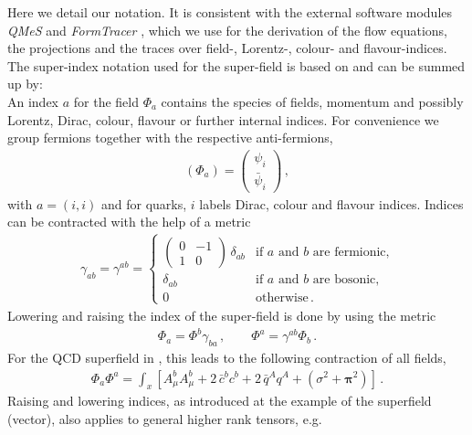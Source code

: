 \documentclass[aps,twocolumn,prd,superscriptaddress]{revtex4-2}
\begin{document}
Here we detail our notation. It is consistent with the external software modules \textit{QMeS} \cite{Pawlowski:2021tkk} and \textit{FormTracer} \cite{Cyrol:2016zqb}, which we use for the derivation of the flow equations, the projections and the traces over field-, Lorentz-, colour- and flavour-indices. The super-index notation used for the super-field  is based on \cite{Pawlowski:2005xe} and can be summed up by:\\[-2ex]

An index $a$ for the field $\Phi_a$ contains the species of fields, momentum and possibly Lorentz, Dirac, colour, flavour or further internal indices. For convenience we group fermions together with the respective anti-fermions, 
%
\begin{align}
	(\Phi_a) = \begin{pmatrix}
		\psi_{i} \\ \bar{\psi}_{i} 
	\end{pmatrix} \,, 
	\label{eq:PsiBarPsi}
\end{align}
%
with $a=(i,i)$ and for quarks, $i$ labels Dirac, colour and flavour indices. Indices can be contracted with the help of a metric
%
\begin{align}
	\gamma_{ab} = \gamma^{ab} = \begin{cases}
		\begin{pmatrix}
			0 & -1 \\
			1 & 0
		\end{pmatrix}\,\delta_{ab}
		& \text{if $a$ and $b$ are fermionic,} \\[3ex]
		\delta_{ab} & \text{if $a$ and $b$ are bosonic,}   \\[2ex]
		0               & \text{otherwise} \,.
	\end{cases}
\end{align}
%
Lowering and raising the index of the super-field is done by using the metric
%
\begin{align}
	\Phi_a = \Phi^b\gamma_{ba} \,,
	\quad \quad
	\Phi^a = \gamma^{ab}\Phi_b \,.
\end{align}
%
For the QCD superfield in , this leads to the following contraction of all fields,
%
\begin{align}
\Phi_a 	\Phi^a =\int_x \left[ A_\mu^b A_\mu^b+ 2\, \bar c^b c^b + 2 \,\bar q^A q^A +\left(  \sigma^2 +\boldsymbol{\pi}^2\right)\right] \,.
	\label{eq:SuperfildSquared}
\end{align}
%
Raising and lowering indices, as introduced at the example of the superfield (vector), also applies to general higher rank tensors, e.g.
\end{document}
